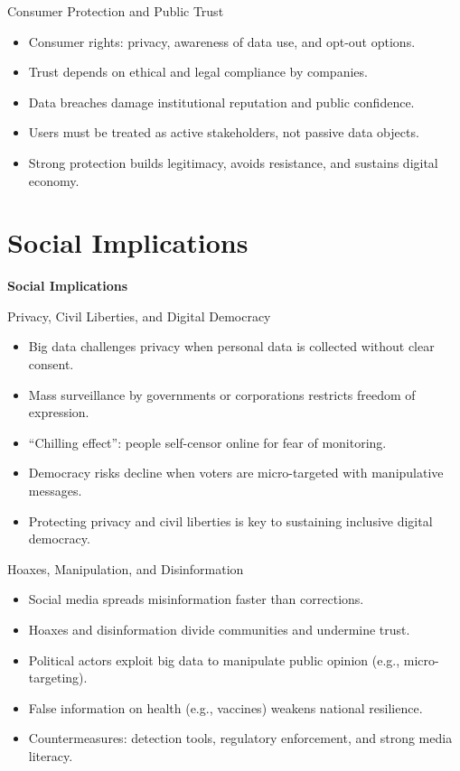 \documentclass[aspectratio=169, table]{beamer}
\begin{document}
\begin{frame}{Consumer Protection and Public Trust}
	\vspace{20pt}
	\begin{itemize}
		\item Consumer rights: privacy, awareness of data use, and opt-out options.  
		\item Trust depends on ethical and legal compliance by companies.  
		\item Data breaches damage institutional reputation and public confidence.  
		\item Users must be treated as active stakeholders, not passive data objects.  
		\item Strong protection builds legitimacy, avoids resistance, and sustains digital economy.  
	\end{itemize}
\end{frame}

\section{Social Implications}
\begin{frame}{\hfill}
	\centering
	\Huge{\textbf{Social Implications}}
\end{frame}

\begin{frame}{Privacy, Civil Liberties, and Digital Democracy}
	\vspace{20pt}
	\begin{itemize}
		\item Big data challenges privacy when personal data is collected without clear consent.  
		\item Mass surveillance by governments or corporations restricts freedom of expression.  
		\item “Chilling effect”: people self-censor online for fear of monitoring.  
		\item Democracy risks decline when voters are micro-targeted with manipulative messages.  
		\item Protecting privacy and civil liberties is key to sustaining inclusive digital democracy.  
	\end{itemize}
\end{frame}

\begin{frame}{Hoaxes, Manipulation, and Disinformation}
	\vspace{20pt}
	\begin{itemize}
		\item Social media spreads misinformation faster than corrections.  
		\item Hoaxes and disinformation divide communities and undermine trust.  
		\item Political actors exploit big data to manipulate public opinion (e.g., micro-targeting).  
		\item False information on health (e.g., vaccines) weakens national resilience.  
		\item Countermeasures: detection tools, regulatory enforcement, and strong media literacy.  
	\end{itemize}
\end{frame}
\end{document}
